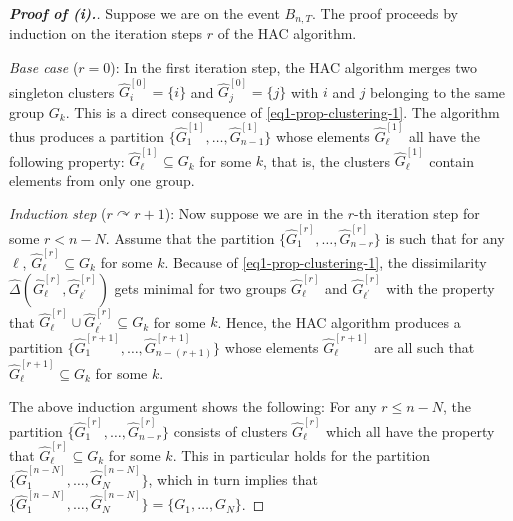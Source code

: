 \documentclass[a4paper,12pt]{article}
\begin{document}
\begin{proof}[\textnormal{\textbf{Proof of (i).}}]
Suppose we are on the event $B_{n,T}$. The proof proceeds by induction on the iteration steps $r$ of the HAC algorithm. 
\vspace{7pt}

\textit{Base case} ($r=0$): In the first iteration step, the HAC algorithm merges two singleton clusters $\widehat{G}_i^{[0]} = \{ i \}$ and $\widehat{G}_j^{[0]} = \{ j \}$ with $i$ and $j$ belonging to the same group $G_k$. This is a direct consequence of \eqref{eq1-prop-clustering-1}. The algorithm thus produces a partition $\{ \widehat{G}_1^{[1]},\ldots,\widehat{G}_{n-1}^{[1]} \}$ whose elements $\widehat{G}_\ell^{[1]}$ all have the following property: $\widehat{G}_\ell^{[1]} \subseteq G_k$ for some $k$, that is, the clusters $\widehat{G}_\ell^{[1]}$ contain elements from only one group. 
\vspace{7pt}

\textit{Induction step} ($r \curvearrowright r+1$): Now suppose we are in the $r$-th iteration step for some $r < n-N$. Assume that the partition $\{\widehat{G}_1^{[r]},\ldots,\widehat{G}_{n-r}^{[r]}\}$ is such that for any $\ell$, $\widehat{G}_\ell^{[r]} \subseteq G_k$ for some $k$. Because of \eqref{eq1-prop-clustering-1}, the dissimilarity $\widehat{\Delta}(\widehat{G}_\ell^{[r]},\widehat{G}_{\ell^\prime}^{[r]})$ gets minimal for two groups $\widehat{G}_\ell^{[r]}$ and $\widehat{G}_{\ell^\prime}^{[r]}$ with the property that $\widehat{G}_\ell^{[r]} \cup \widehat{G}_{\ell^\prime}^{[r]} \subseteq G_k$ for some $k$. Hence, the HAC algorithm produces a partition $\{ \widehat{G}_1^{[r+1]},\ldots,\widehat{G}_{n-(r+1)}^{[r+1]} \}$ whose elements $\widehat{G}_\ell^{[r+1]}$ are all such that $\widehat{G}_\ell^{[r+1]} \subseteq G_k$ for some $k$. 
\vspace{7pt}

The above induction argument shows the following: For any $r \le n - N$, the partition $\{ \widehat{G}_1^{[r]},\ldots,\widehat{G}_{n-r}^{[r]} \}$ consists of clusters $\widehat{G}_\ell^{[r]}$ which all have the property that $\widehat{G}_\ell^{[r]} \subseteq G_k$ for some $k$. This in particular holds for the partition $\{ \widehat{G}_1^{[n-N]},\ldots,\widehat{G}_N^{[n-N]} \}$, which in turn implies that $\{ \widehat{G}_1^{[n-N]},\ldots,\widehat{G}_N^{[n-N]} \} =\{ G_1,\ldots,G_N \}$.  
\end{proof}
\end{document}
